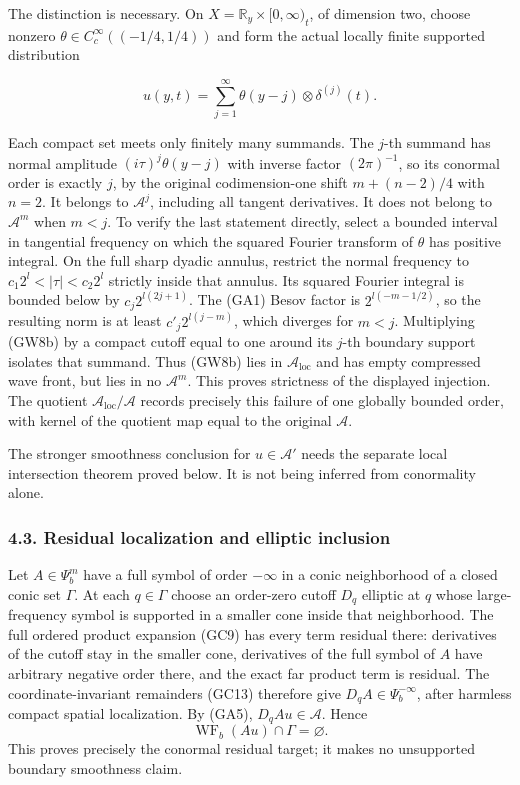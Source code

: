 \documentclass[
  11pt,
]{article}
\begin{document}
The distinction is necessary. On \(X=\mathbb R_y\times[0,\infty)_t\), of
dimension two, choose nonzero \(\theta\in C_c^\infty((-1/4,1/4))\) and
form the actual locally finite supported distribution

\[
 u(y,t)=\sum_{j=1}^\infty\theta(y-j)\otimes\delta^{(j)}(t).
 \tag{GW8b}
\]

Each compact set meets only finitely many summands. The \(j\)-th summand
has normal amplitude \((i\tau)^j\theta(y-j)\) with inverse factor
\((2\pi)^{-1}\), so its conormal order is exactly \(j\), by the original
codimension-one shift \(m+(n-2)/4\) with \(n=2\). It belongs to
\(\mathcal A^j\), including all tangent derivatives. It does not belong
to \(\mathcal A^m\) when \(m<j\). To verify the last statement directly,
select a bounded interval in tangential frequency on which the squared
Fourier transform of \(\theta\) has positive integral. On the full sharp
dyadic annulus, restrict the normal frequency to
\(c_1 2^l<|\tau|<c_2 2^l\) strictly inside that annulus. Its squared
Fourier integral is bounded below by \(c_j2^{l(2j+1)}\). The (GA1) Besov
factor is \(2^{l(-m-1/2)}\), so the resulting norm is at least
\(c'_j2^{l(j-m)}\), which diverges for \(m<j\). Multiplying (GW8b) by a
compact cutoff equal to one around its \(j\)-th boundary support
isolates that summand. Thus (GW8b) lies in \(\mathcal A_{\mathrm{loc}}\)
and has empty compressed wave front, but lies in no \(\mathcal A^m\).
This proves strictness of the displayed injection. The quotient
\(\mathcal A_{\mathrm{loc}}/\mathcal A\) records precisely this failure
of one globally bounded order, with kernel of the quotient map equal to
the original \(\mathcal A\).

The stronger smoothness conclusion for \(u\in\mathcal A'\) needs the
separate local intersection theorem proved below. It is not being
inferred from conormality alone.

\subsubsection{4.3. Residual localization and elliptic
inclusion}\label{residual-localization-and-elliptic-inclusion}

Let \(A\in\Psi_b^m\) have a full symbol of order \(-\infty\) in a conic
neighborhood of a closed conic set \(\Gamma\). At each \(q\in\Gamma\)
choose an order-zero cutoff \(D_q\) elliptic at \(q\) whose
large-frequency symbol is supported in a smaller cone inside that
neighborhood. The full ordered product expansion (GC9) has every term
residual there: derivatives of the cutoff stay in the smaller cone,
derivatives of the full symbol of \(A\) have arbitrary negative order
there, and the exact far product term is residual. The
coordinate-invariant remainders (GC13) therefore give
\(D_qA\in\Psi_b^{-\infty}\), after harmless compact spatial
localization. By (GA5), \(D_qAu\in\mathcal A\). Hence \[
 \operatorname{WF}_b(Au)\cap\Gamma=\varnothing.
 \tag{GW9}
\] This proves precisely the conormal residual target; it makes no
unsupported boundary smoothness claim.
\end{document}
